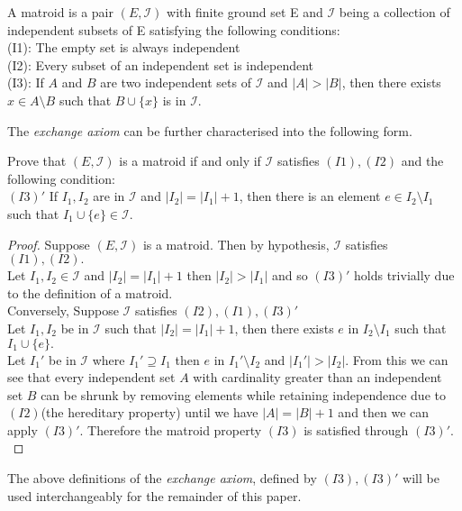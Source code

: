 \documentclass[../main.tex]{subfiles}
\begin{document}
\begin{defn}
A matroid is a pair $(E,\mathcal{I})$ with finite ground set E and $\mathcal{I}$ being a collection of independent subsets of E satisfying the following conditions:\\
\noindent (I1): The empty set is always independent\\
\noindent (I2): Every subset of an independent set is independent\\
\noindent (I3): If $ A $ and $ B $ are two independent sets of $\mathcal{I}$ and $|A|>|B|$, then there exists $x \in A \setminus B$ such that $B \cup \{ x \}$ is in $\mathcal{I}.$
\end{defn}
The \textit{exchange axiom} can be further characterised into the following form.
\begin{lem}
Prove that $(E,\mathcal{I})$ is a matroid if and only if $\mathcal{I}$ satisfies $(I1), (I2)$ and the following condition:\\
\noindent $(I3)'$ If $I_1,I_2$ are in $\mathcal{I}$ and $|I_2|=|I_1|+1$, then there is an element $e \in I_2 \setminus I_1$ such that $I_1 \cup \{e\} \in \mathcal{I}.$
\end{lem}
\begin{proof}
Suppose $(E,\mathcal{I})$ is a matroid. Then by hypothesis, $\mathcal{I}$ satisfies $(I1),(I2).$\\
\noindent Let $I_1,I_2 \in \mathcal{I}$ and $|I_2|=|I_1|+1$ then $|I_2|>|I_1|$ and so $(I3)'$ holds trivially due to the definition of a matroid.\\
Conversely, Suppose $\mathcal{I}$ satisfies $(I2),(I1),(I3)'$\\
Let $I_1,I_2$ be in $\mathcal{I}$ such that $|I_2|=|I_1|+1$, then there exists $e$ in $I_2 \setminus I_1$ such that $I_1 \cup \{e\}.$\\
Let $I_1'$ be in $\mathcal{I}$ where $I_1' \supseteq I_1$ then $e$ in $I_1' \setminus I_2$ and $|I_1'|>|I_2|.$ From this we can see that every independent set $A$ with cardinality greater than an independent set $B$ can be shrunk by removing elements while retaining independence due to $(I2)$(the hereditary property) until we have $|A|=|B|+1$ and then we can apply $(I3)'.$ Therefore the matroid property $(I3)$ is satisfied through $(I3)'.$
\end{proof}

\begin{note}
The above definitions of the \textit{exchange axiom}, defined by $(I3), (I3)'$ will be used interchangeably for the remainder of this paper.
\end{note}
\end{document}
